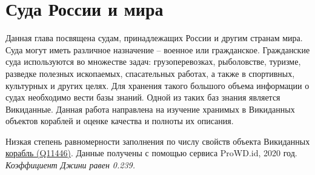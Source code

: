 \chapter{Суда России и мира}
\label{ch:ships-chapter}

Данная глава посвящена судам, принадлежащих России и другим странам мира. Суда могут иметь различное назначение -- военное или гражданское. Гражданские суда используются во множестве задач: грузоперевозках, рыболовстве, туризме, разведке полезных ископаемых, спасательных работах, а также в спортивных, культурных и других целях. Для хранения такого большого объема информации о судах необходимо вести базы знаний. Одной из таких баз знания является Викиданные. Данная работа направлена на изучение хранимых в Викиданных объектов кораблей и оценке качества и полноты их описания.


\begin{marginfigure}[0.0cm]
  {
    \setlength{\fboxsep}{0pt}%
    \setlength{\fboxrule}{1pt}%
  }
  \caption{
    Низкая степень равномерности заполнения по числу свойств объекта Викиданных \href{https://www.wikidata.org/wiki/Q11446}{корабль (Q11446)}.  Данные получены с помощью сервиса ProWD.id, 2020 год. \emph{Коэффициент Джини равен 0.239.}
    }%
    \label{fig:prowd_ships-unbalanced}%
  \end{marginfigure}


